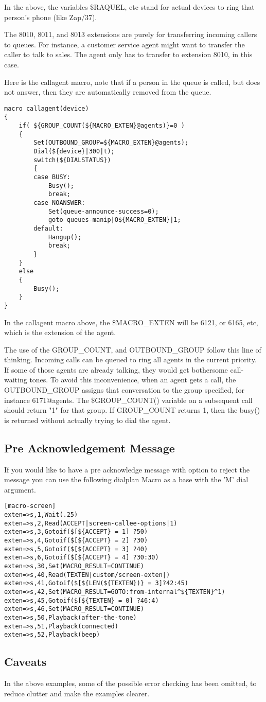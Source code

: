 In the above, the variables \${RAQUEL}, etc stand for
actual devices to ring that person's
phone (like Zap/37).

The 8010, 8011, and 8013 extensions are purely for transferring
incoming callers to queues. For instance, a customer service 
agent might want to transfer the caller to talk to sales. The 
agent only has to transfer to extension 8010, in this case.

Here is the callagent macro, note that if a person in the
queue is called, but does not answer, then they are automatically
removed from the queue.

\begin{verbatim}
macro callagent(device)
{
	if( ${GROUP_COUNT(${MACRO_EXTEN}@agents)}=0 )
	{
		Set(OUTBOUND_GROUP=${MACRO_EXTEN}@agents);
		Dial(${device}|300|t);
		switch(${DIALSTATUS})
		{
		case BUSY:
			Busy();
			break;
		case NOANSWER:
			Set(queue-announce-success=0);
			goto queues-manip|O${MACRO_EXTEN}|1;
		default:
			Hangup();
			break;
		}
	}
	else
	{
		Busy();
	}
}
\end{verbatim}

In the callagent macro above, the \${MACRO\_EXTEN} will
be 6121, or 6165, etc, which is the extension of the agent.

The use of the GROUP\_COUNT, and OUTBOUND\_GROUP follow this line
of thinking. Incoming calls can be queued to ring all agents in the
current priority. If some of those agents are already talking, they
would get bothersome call-waiting tones. To avoid this inconvenience,
when an agent gets a call, the OUTBOUND\_GROUP assigns that 
conversation to the group specified, for instance 6171@agents.
The \${GROUP\_COUNT()} variable on a subsequent call should return
"1" for that group. If GROUP\_COUNT returns 1, then the busy() 
is returned without actually trying to dial the agent.

\subsection{Pre Acknowledgement Message}

If you would like to have a pre acknowledge message with option to reject the message
you can use the following dialplan Macro as a base with the 'M' dial argument.

\begin{verbatim}
[macro-screen]
exten=>s,1,Wait(.25)
exten=>s,2,Read(ACCEPT|screen-callee-options|1)
exten=>s,3,Gotoif($[${ACCEPT} = 1] ?50)
exten=>s,4,Gotoif($[${ACCEPT} = 2] ?30)
exten=>s,5,Gotoif($[${ACCEPT} = 3] ?40)
exten=>s,6,Gotoif($[${ACCEPT} = 4] ?30:30)
exten=>s,30,Set(MACRO_RESULT=CONTINUE)
exten=>s,40,Read(TEXTEN|custom/screen-exten|)
exten=>s,41,Gotoif($[${LEN(${TEXTEN})} = 3]?42:45)
exten=>s,42,Set(MACRO_RESULT=GOTO:from-internal^${TEXTEN}^1)
exten=>s,45,Gotoif($[${TEXTEN} = 0] ?46:4)
exten=>s,46,Set(MACRO_RESULT=CONTINUE)
exten=>s,50,Playback(after-the-tone)
exten=>s,51,Playback(connected)
exten=>s,52,Playback(beep)
\end{verbatim}

\subsection{Caveats}

In the above examples, some of the possible error checking has been omitted,
to reduce clutter and make the examples clearer.

